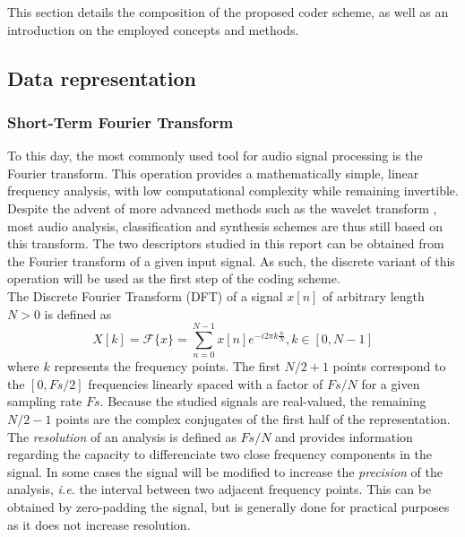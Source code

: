 \documentclass[12pt,times,onecolumn]{article}
\begin{document}
This section details the composition of the proposed coder scheme, as well as an introduction on the employed concepts and methods.

\subsection{Data representation}
\subsubsection{Short-Term Fourier Transform}
To this day, the most commonly used tool for audio signal processing is the Fourier transform. This operation provides a mathematically simple, linear frequency analysis, with low computational complexity while remaining invertible. Despite the advent of more advanced methods such as the wavelet transform \cite{bentley1994}, most audio analysis, classification and synthesis schemes are thus still based on this transform. The two descriptors studied in this report can be obtained from the Fourier transform of a given input signal. As such, the discrete variant of this operation will be used as the first step of the coding scheme.\\

The Discrete Fourier Transform (DFT) of a signal $x[n]$ of arbitrary length $N>0$ is defined as
\begin{equation}
X[k] = \mathcal{F}\{x\} = \sum\limits_{n = 0}^{N-1} x[n]e^{-i2\pi k\frac{n}{N}}, k\in [0, N-1]
\end{equation}
where $k$ represents the frequency points. The first $N/2+1$ points correspond to the $[0, Fs/2]$ frequencies linearly spaced with a factor of $Fs/N$ for a given sampling rate $Fs$. Because the studied signals are real-valued, the remaining $N/2-1$ points are the complex conjugates of the first half of the representation. The \textit{resolution} of an analysis is defined as $Fs/N$ and provides information regarding the capacity to differenciate two close frequency components in the signal. In some cases the signal will be modified to increase the \textit{precision} of the analysis, \textit{i.e.} the interval between two adjacent frequency points. This can be obtained by zero-padding the signal, but is generally done for practical purposes as it does not increase resolution.
\end{document}
